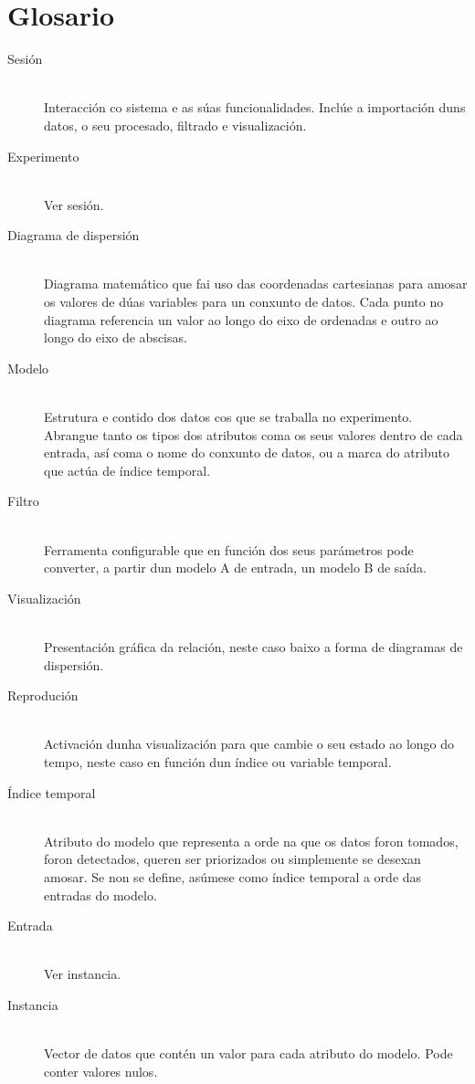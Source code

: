\pagestyle{plain}
\chapter*{Glosario}
\begin{description}
  \item[Sesión] \hfill \\
  Interacción co sistema e as súas funcionalidades. Inclúe a importación duns datos, o seu procesado, filtrado e visualización.
  \item[Experimento] \hfill \\
  Ver sesión.
	\item[Diagrama de dispersión] \hfill \\
  Diagrama matemático que fai uso das coordenadas cartesianas para amosar os valores de dúas variables para un conxunto de datos. Cada punto no diagrama referencia un valor ao longo do eixo de ordenadas e outro ao longo do eixo de abscisas.
	\item[Modelo] \hfill \\
  Estrutura e contido dos datos cos que se traballa no experimento. Abrangue tanto os tipos dos atributos coma os seus valores dentro de cada entrada, así coma o nome do conxunto de datos, ou a marca do atributo que actúa de índice temporal.
	\item[Filtro] \hfill \\
  Ferramenta configurable que en función dos seus parámetros pode converter, a partir dun modelo A de entrada, un modelo B de saída.
	\item[Visualización] \hfill \\
  Presentación gráfica da relación, neste caso baixo a forma de diagramas de dispersión.
	\item[Reprodución] \hfill \\
  Activación dunha visualización para que cambie o seu estado ao longo do tempo, neste caso en función dun índice ou variable temporal.
	\item[Índice temporal] \hfill \\
  Atributo do modelo que representa a orde na que os datos foron tomados, foron detectados, queren ser priorizados ou simplemente se desexan amosar. Se non se define, asúmese como índice temporal a orde das entradas do modelo.
	\item[Entrada] \hfill \\
  Ver instancia.
	\item[Instancia] \hfill \\
  Vector de datos que contén un valor para cada atributo do modelo. Pode conter valores nulos.

\end{description}
